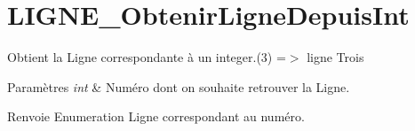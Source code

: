 \hypertarget{LIGNE_ObtenirLigneDepuisInt-example}{}\section{L\+I\+G\+N\+E\+\_\+\+Obtenir\+Ligne\+Depuis\+Int}
Obtient la Ligne correspondante à un integer.(3) =$>$ ligne Trois


\begin{DoxyParams}{Paramètres}
{\em int} & Numéro dont on souhaite retrouver la Ligne.\\
\hline
\end{DoxyParams}
\begin{DoxyReturn}{Renvoie}
Enumeration Ligne correspondant au numéro.
\end{DoxyReturn}

\begin{DoxyCodeInclude}
\end{DoxyCodeInclude}
 